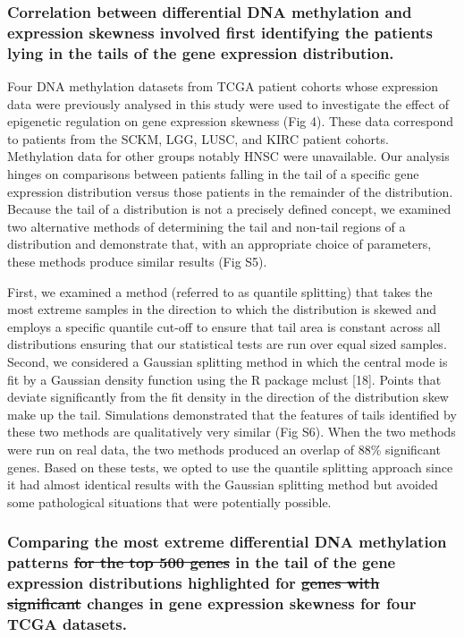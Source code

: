 \documentclass[11pt]{article}
\newcommand{\sr}[1]{{\color{red} \st{#1} }}
\newcommand{\rd}[1]{{\color{red}#1}}
\begin{document}
\subsubsection*{Correlation between differential DNA methylation and expression skewness involved first identifying the patients lying in the tails of the gene expression distribution.}

Four DNA methylation datasets from TCGA patient cohorts whose expression data were previously analysed in this study were used to investigate the effect of epigenetic regulation on gene expression skewness (Fig 4). These data correspond to patients from the SCKM, LGG, LUSC, and KIRC patient cohorts. Methylation data for other groups notably HNSC were unavailable. Our analysis hinges on comparisons between patients falling in the tail of a specific gene expression distribution versus those patients in the remainder of the distribution. Because the tail of a distribution is not a precisely defined concept, we examined two alternative methods of determining the tail and non-tail regions of a distribution and demonstrate that, with an appropriate choice of parameters, these methods produce similar results (Fig S5). 
\newline

First, we examined a method (referred to as quantile splitting) that takes the most extreme samples in the direction to which the distribution is skewed and employs a specific quantile cut-off to ensure that tail area is constant across all distributions ensuring that our statistical tests are run over equal sized samples. Second, we considered a Gaussian splitting method in which the central mode is fit by a Gaussian density function using the R package mclust [18]. Points that deviate significantly from the fit density in the direction of the distribution skew make up the tail. Simulations demonstrated that the features of tails identified by these two methods are qualitatively very similar (Fig S6). When the two methods were run on real data, the two methods produced an overlap of 88\% significant genes. Based on these tests, we opted to use the quantile splitting approach since it had almost identical results with the Gaussian splitting method but avoided some pathological situations that were potentially possible. 

\subsubsection*{Comparing \rd{the most extreme differential} DNA methylation patterns \sr{for the top 500 genes} in the tail of the gene expression distributions highlighted \rd{for} \sr{genes with significant} changes in \rd{gene} expression skewness for four TCGA datasets.}
\end{document}
